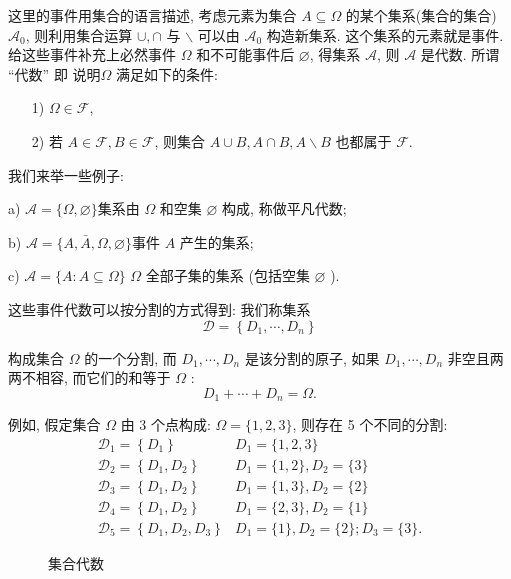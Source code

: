 这里的事件用集合的语言描述, 考虑元素为集合 $A \subseteq \Omega$ 的某个集系(集合的集合) $\mathscr{A}_0$, 则利用集合运算 $\cup, \cap$ 与 $\backslash$ 可以由 $\mathscr{A}_0$ 构造新集系. 这个集系的元素就是事件. 给这些事件补充上必然事件 $\Omega$ 和不可能事件后 $\varnothing$, 得集系 $\mathscr{A}$, 则 $\mathcal{A}$ 是代数. 所谓 ``代数'' 即 说明$\Omega$ 满足如下的条件: 
\begin{itemize}
    \item [1)] $\Omega \in \mathcal{F}$,
    \item    [2)] 若 $A \in \mathcal{F}, B \in \mathcal{F}$, 则集合 $A \cup B, A \cap B, A \backslash B$ 也都属于 $\mathcal{F}$.
\end{itemize}

我们来举一些例子: 
\begin{example}
    a) $\mathscr{A}=\{\Omega, \varnothing\}$集系由 $\Omega$ 和空集 $\varnothing$ 构成, 称做平凡代数;

b) $\mathscr{A}=\{A, \bar{A}, \Omega, \varnothing\}$事件 $A$ 产生的集系;

c) $\mathscr{A}=\{A: A \subseteq \Omega\}$ $\Omega$ 全部子集的集系 (包括空集 $\varnothing$ ).
\end{example}

这些事件代数可以按分割的方式得到: 我们称集系
$$
\mathscr{D}=\left\{D_1, \cdots, D_n\right\}
$$

构成集合 $\Omega$ 的一个分割, 而 $D_1, \cdots, D_n$ 是该分割的原子, 如果 $D_1, \cdots, D_n$ 非空且两两不相容, 而它们的和等于 $\Omega$ :
$$
D_1+\cdots+D_n=\Omega .
$$

例如, 假定集合 $\Omega$ 由 3 个点构成: $\Omega=\{1,2,3\}$, 则存在 5 个不同的分割:
$$
\begin{array}{ll}
\mathscr{D}_1=\left\{D_1\right\} & D_1=\{1,2,3\} \\
\mathscr{D}_2=\left\{D_1, D_2\right\} & D_1=\{1,2\}, D_2=\{3\} \\
\mathscr{D}_3=\left\{D_1, D_2\right\} & D_1=\{1,3\}, D_2=\{2\} \\
\mathscr{D}_4=\left\{D_1, D_2\right\} & D_1=\{2,3\}, D_2=\{1\} \\
\mathscr{D}_5=\left\{D_1, D_2, D_3\right\} & D_1=\{1\}, D_2=\{2\} ; D_3=\{3\} .
\end{array}
$$

\begin{wrapfigure}{l}{0.6\textwidth}
     
    \caption{集合代数}
    \label{fig:set-alg}
\end{wrapfigure}

